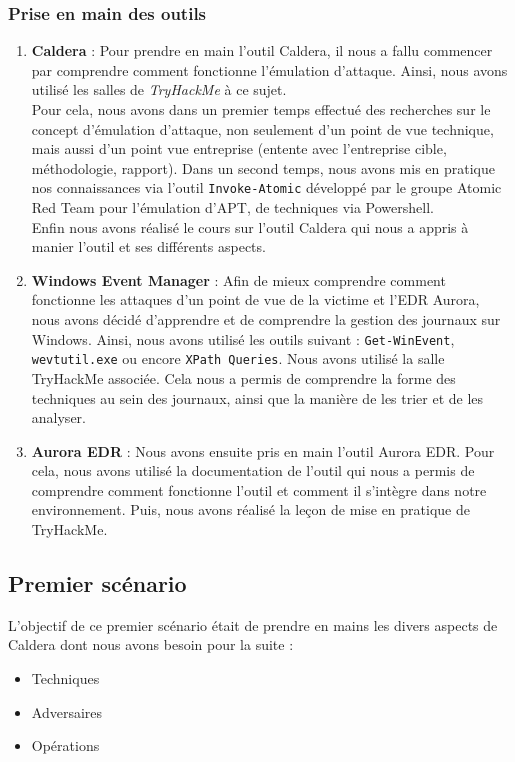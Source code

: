 \documentclass[12pt,letterpaper]{article}
\begin{document}
\subsubsection{Prise en main des outils}
\begin{enumerate}
    \item \textbf{Caldera} : 
    Pour prendre en main l'outil Caldera, il nous a fallu commencer par comprendre comment fonctionne l'émulation d'attaque.
    Ainsi, nous avons utilisé les salles de \textit{TryHackMe} à ce sujet. \\

    Pour cela, nous avons dans un premier temps effectué des recherches sur le concept d'émulation d'attaque, non seulement d'un point de vue technique, mais aussi d'un point vue entreprise (entente avec l'entreprise cible, méthodologie, rapport).
    Dans un second temps, nous avons mis en pratique nos connaissances via l'outil \verb|Invoke-Atomic| développé par le groupe Atomic Red Team pour l'émulation d'APT, de techniques via Powershell. \\

    Enfin nous avons réalisé le cours sur l'outil Caldera qui nous a appris à manier l'outil et ses différents aspects. 

    \item \textbf{Windows \- Event Manager} :
    Afin de mieux comprendre comment fonctionne les attaques d'un point de vue de la victime et l'EDR Aurora, nous avons décidé d'apprendre et de comprendre la gestion des journaux sur Windows.
    Ainsi, nous avons utilisé les outils suivant : \verb|Get-WinEvent|, \verb|wevtutil.exe| ou encore \verb|XPath Queries|.
    Nous avons utilisé la salle TryHackMe associée.
    Cela nous a permis de comprendre la forme des techniques au sein des journaux, ainsi que la manière de les trier et de les analyser. \\
    
    \item \textbf{Aurora EDR} :
    Nous avons ensuite pris en main l'outil Aurora EDR.
    Pour cela, nous avons utilisé la documentation de l'outil qui nous a permis de comprendre comment fonctionne l'outil et comment il s'intègre dans notre environnement.
    Puis, nous avons réalisé la leçon de mise en pratique de TryHackMe. \\
\end{enumerate}

\newpage
\subsection{Premier scénario}
L'objectif de ce premier scénario était de prendre en mains les divers aspects de Caldera dont nous avons besoin pour la suite :
\begin{itemize}
    \item Techniques
    \item Adversaires
    \item Opérations
\end{itemize}
\end{document}
